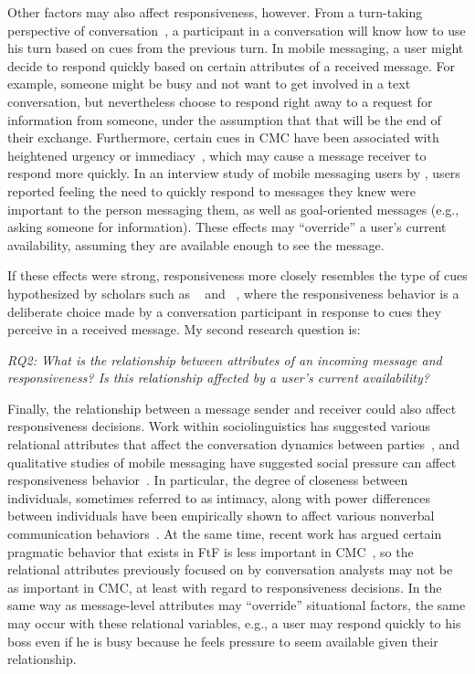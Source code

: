 \documentclass[12pt]{nuthesis}	%
\begin{document}
Other factors may also affect responsiveness, however. From a turn-taking perspective of conversation~\citep{sacks1974simplest}, a participant in a conversation will know how to use his turn based on  cues from the previous turn. In mobile messaging, a user might decide to respond quickly based on certain attributes of a received message. For example, someone might be busy and not want to get involved in a text conversation, but nevertheless choose to respond right away to a request for information from someone, under the assumption that that will be the end of their exchange. Furthermore, certain cues in CMC have been associated with heightened urgency or immediacy~\citep{nguyen2014lexical}, which may cause a message receiver to respond more quickly. In an interview study of mobile messaging users by \citet{cui2016beyond}, users reported feeling the need to quickly respond to messages they knew were important to the person messaging them, as well as goal-oriented messages (e.g., asking someone for information). These effects may ``override'' a user's current availability, assuming they are available enough to see the message.

If these effects were strong, responsiveness more closely resembles the type of cues hypothesized by scholars such as ~\citet{walther1995nonverbal} and ~\citet{kalman2006pauses}, where the responsiveness behavior is a deliberate choice made by a conversation participant in response to cues they perceive in a received message. My second research question is:

\textit{RQ2: What is the relationship between attributes of an incoming message and responsiveness? Is this relationship affected by a user's current availability?}

Finally, the relationship between a message sender and receiver could also affect responsiveness decisions. Work within sociolinguistics has suggested various relational attributes that affect the conversation dynamics between parties~\citep{brown1987politeness,goldberg1990interrupting,west1979against,wolfson1990bulge}, and qualitative studies of mobile messaging have suggested social pressure can affect responsiveness behavior~\citep{church2013s,laursen2005please,tjora2011invisible,weilenmann2003can}. In particular, the degree of closeness between individuals, sometimes referred to as intimacy, along with power differences between individuals have been empirically shown to affect various nonverbal communication behaviors~\citep{guerrero1991waxing,henley1973power,leffler1982effects,sternglanz2004reading}.  At the same time, recent work has argued certain pragmatic behavior that exists in FtF is less important in CMC~\citep{schulze2017knowledge,stromer2015context}, so the relational attributes previously focused on by conversation analysts may not be as important in CMC, at least with regard to responsiveness decisions. In the same way as message-level attributes may ``override'' situational factors, the same may occur with these relational variables, e.g., a user may respond quickly to his boss even if he is busy because he feels pressure to seem available given their relationship.
\end{document}
